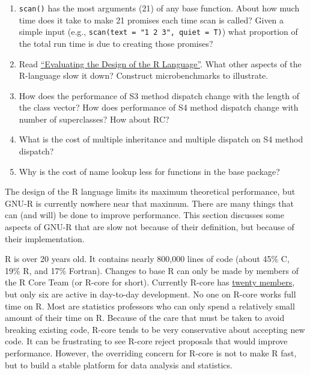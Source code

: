 \begin{enumerate}
\def\labelenumi{\arabic{enumi}.}
\item
  \texttt{scan()} has the most arguments (21) of any base function.
  About how much time does it take to make 21 promises each time scan is
  called? Given a simple input (e.g.,
  \texttt{scan(text = "1 2 3", quiet = T)}) what proportion of the total
  run time is due to creating those promises?
\item
  Read
  \href{https://www.cs.purdue.edu/homes/jv/pubs/ecoop12.pdf}{``Evaluating
  the Design of the R Language''}. What other aspects of the R-language
  slow it down? Construct microbenchmarks to illustrate.
\item
  How does the performance of S3 method dispatch change with the length
  of the class vector? How does performance of S4 method dispatch change
  with number of superclasses? How about RC?
\item
  What is the cost of multiple inheritance and multiple dispatch on S4
  method dispatch?
\item
  Why is the cost of name lookup less for functions in the base package?
\end{enumerate}


The design of the R language limits its maximum theoretical performance,
but GNU-R is currently nowhere near that maximum. There are many things
that can (and will) be done to improve performance. This section
discusses some aspects of GNU-R that are slow not because of their
definition, but because of their implementation.

R is over 20 years old. It contains nearly 800,000 lines of code (about
45\% C, 19\% R, and 17\% Fortran). Changes to base R can only be made by
members of the R Core Team (or R-core for short). Currently R-core has
\href{http://www.r-project.org/contributors.html}{twenty members}, but
only six are active in day-to-day development. No one on R-core works
full time on R. Most are statistics professors who can only spend a
relatively small amount of their time on R. Because of the care that
must be taken to avoid breaking existing code, R-core tends to be very
conservative about accepting new code. It can be frustrating to see
R-core reject proposals that would improve performance. However, the
overriding concern for R-core is not to make R fast, but to build a
stable platform for data analysis and statistics. 

